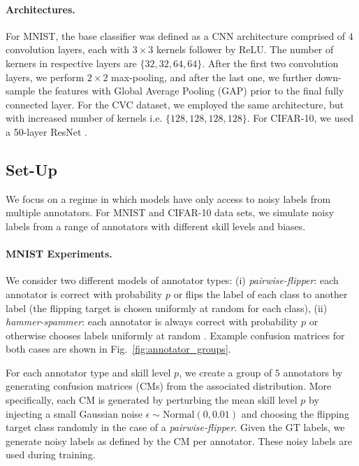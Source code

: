 \paragraph{Architectures. } For MNIST, the base classifier was defined as a CNN architecture comprised of $4$ convolution layers, each with $3\times3$ kernels follower by ReLU. The number of kerners in respective layers are $\{32, 32, 64, 64\}$. After the first two convolution layers, we perform $2\times2$ max-pooling, and after the last one, we further down-sample the features with Global Average Pooling (GAP) prior to the final fully connected layer. For the CVC dataset, we employed the same architecture, but with increased number of kernels i.e. $\{128, 128, 128, 128\}$. For CIFAR-10, we used a 50-layer ResNet \cite{he2016deep}.



\subsection{Set-Up}
We focus on a regime in which models have only access to noisy labels from multiple annotators. For MNIST and CIFAR-10 data sets, we simulate noisy labels from a range of annotators with different skill levels and biases.

\paragraph{MNIST Experiments.} We consider two different models of annotator types: (i) \textit{pairwise-flipper}: each annotator is correct with probability $p$ or flips the label of each class to another label (the flipping target is chosen uniformly at random for each class), (ii) \textit{hammer-spammer}: each annotator is always correct with probability $p$ or otherwise chooses labels uniformly at random \cite{khetan2017learning}. Example confusion matrices for both cases are shown in Fig.~\ref{fig:annotator_groups}.

For each annotator type and skill level $p$, we create a group of $5$ annotators by generating confusion matrices (CMs) from the associated distribution. More specifically, each CM is generated by perturbing the mean skill level $p$ by injecting a small Gaussian noise $\epsilon \sim \text{Normal}(0, 0.01)$ and choosing the flipping target class randomly in the case of a \textit{pairwise-flipper}. Given the GT labels, we generate noisy labels as defined by the CM per annotator. These noisy labels are used during training.

